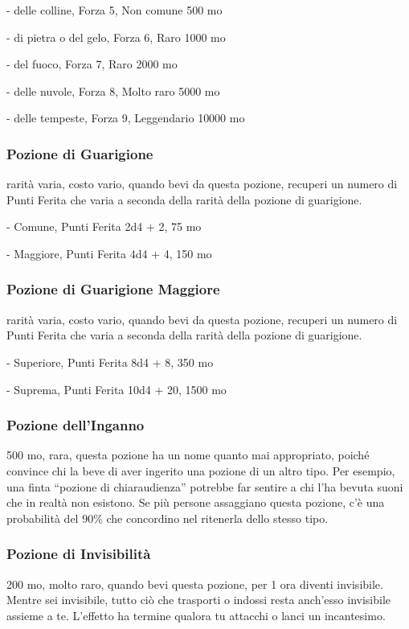 \begin{multicols}{2}
- delle colline, Forza 5, Non comune 500 mo

- di pietra o del gelo, Forza 6, Raro 1000 mo

- del fuoco, Forza 7, Raro 2000 mo

- delle nuvole, Forza 8, Molto raro 5000 mo

- delle tempeste, Forza 9, Leggendario 10000 mo

\subsubsection*{Pozione di Guarigione}
rarità varia, costo vario, quando bevi da questa pozione, recuperi un numero di Punti Ferita che varia a seconda della rarità della pozione di guarigione.

- Comune, Punti Ferita 2d4 + 2, 75 mo

- Maggiore, Punti Ferita 4d4 + 4, 150 mo

\subsubsection*{Pozione di Guarigione Maggiore}
rarità varia, costo vario, quando bevi da questa pozione, recuperi un numero di Punti Ferita che varia a seconda della rarità della pozione di guarigione.

- Superiore, Punti Ferita 8d4 + 8, 350 mo

- Suprema, Punti Ferita 10d4 + 20, 1500 mo

\subsubsection*{Pozione dell'Inganno}

500 mo, rara, questa pozione ha un nome quanto mai appropriato, poiché convince chi la beve di aver ingerito una pozione di un altro tipo. Per esempio, una finta “pozione di chiaraudienza” potrebbe far sentire a chi l’ha bevuta suoni che in realtà non esistono. Se più persone assaggiano questa pozione, c'è una probabilità del 90\% che concordino nel ritenerla dello stesso tipo.

\subsubsection*{Pozione di Invisibilità}
200 mo, molto raro, quando bevi questa pozione, per 1 ora diventi invisibile. Mentre sei invisibile, tutto ciò che trasporti o indossi resta anch'esso invisibile assieme a te. L'effetto ha termine qualora tu attacchi o lanci un incantesimo.


\end{multicols}
